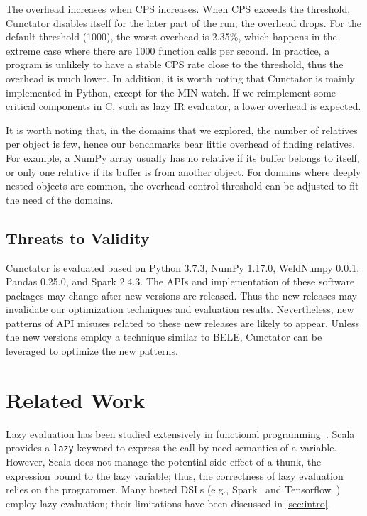 \documentclass[sigconf]{acmart}\settopmatter{printfolios=true,printccs=false,printacmref=false}\setcopyright{none}
\newcommand {\REV}[1]{#1}
\begin{document}
The overhead increases when CPS increases. When CPS exceeds the threshold, Cunctator disables itself for the later part of the run; the overhead drops. For the default threshold (1000), the worst overhead is 2.35\%, which happens in the extreme case where there are 1000 function calls per second. In practice, a program is unlikely to have a stable CPS rate close to the threshold, thus the overhead is much lower. In addition, it is worth noting that Cunctator is mainly implemented in Python, except for the MIN-watch. If we reimplement some critical components in C, such as lazy IR evaluator, a lower overhead is expected.

\REV{It is worth noting that, in the domains that we explored, the number of relatives per object is few, hence our benchmarks bear little overhead of finding relatives. For example, a NumPy array usually has no relative if its buffer belongs to itself, or only one relative if its buffer is from another object. For domains where deeply nested objects are common, the overhead control threshold can be adjusted to fit the need of the domains.}

\subsection{Threats to Validity}

\REV{Cunctator is evaluated based on Python 3.7.3, NumPy 1.17.0, WeldNumpy 0.0.1, Pandas 0.25.0, and Spark 2.4.3. The APIs and implementation of these software packages may change after new versions are released. Thus the new releases may invalidate our optimization techniques and evaluation results. Nevertheless, new patterns of API misuses related to these new releases are likely to appear. Unless the new versions employ a technique similar to BELE, Cunctator can be leveraged to optimize the new patterns.}

\section{Related Work}

Lazy evaluation has been studied extensively in functional programming~\cite{Henderson:1976,Johnsson:1984,bloss1988code,Launchbury:1993,Hudak:2007}. Scala~\cite{odersky2014unifying} provides a \texttt{lazy} keyword to express the call-by-need semantics of a variable. However, Scala does not manage the potential side-effect of a thunk, the expression bound to the lazy variable; thus, the correctness of lazy evaluation relies on the programmer. Many hosted DSLs (e.g., Spark~\cite{Zaharia:2010} and Tensorflow~\cite{abadi2016tensorflow}) employ lazy evaluation; their limitations have been discussed in \cref{sec:intro}. 
\end{document}
